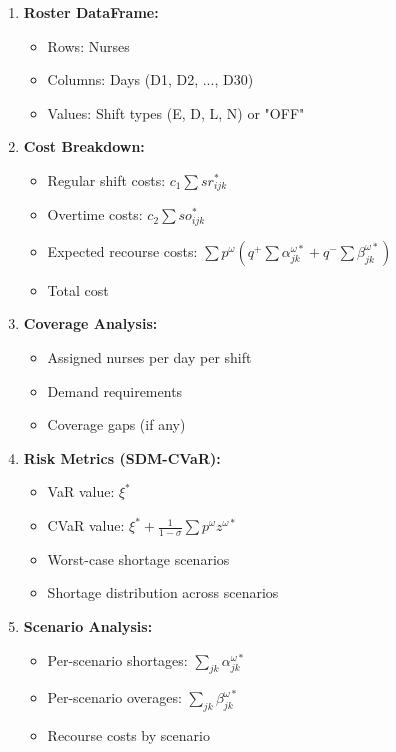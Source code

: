 \documentclass[12pt,a4paper]{article}
\begin{document}
\begin{enumerate}
    \item \textbf{Roster DataFrame:} 
    \begin{itemize}
        \item Rows: Nurses
        \item Columns: Days (D1, D2, ..., D30)
        \item Values: Shift types (E, D, L, N) or "OFF"
    \end{itemize}
    
    \item \textbf{Cost Breakdown:}
    \begin{itemize}
        \item Regular shift costs: $c_1 \sum sr_{ijk}^*$
        \item Overtime costs: $c_2 \sum so_{ijk}^*$
        \item Expected recourse costs: $\sum p^\omega (q^+ \sum \alpha_{jk}^{\omega*} + q^- \sum \beta_{jk}^{\omega*})$
        \item Total cost
    \end{itemize}
    
    \item \textbf{Coverage Analysis:}
    \begin{itemize}
        \item Assigned nurses per day per shift
        \item Demand requirements
        \item Coverage gaps (if any)
    \end{itemize}
    
    \item \textbf{Risk Metrics (SDM-CVaR):}
    \begin{itemize}
        \item VaR value: $\xi^*$
        \item CVaR value: $\xi^* + \frac{1}{1-\sigma} \sum p^\omega z^{\omega*}$
        \item Worst-case shortage scenarios
        \item Shortage distribution across scenarios
    \end{itemize}
    
    \item \textbf{Scenario Analysis:}
    \begin{itemize}
        \item Per-scenario shortages: $\sum_{jk} \alpha_{jk}^{\omega*}$
        \item Per-scenario overages: $\sum_{jk} \beta_{jk}^{\omega*}$
        \item Recourse costs by scenario
    \end{itemize}
\end{enumerate}
\end{document}
